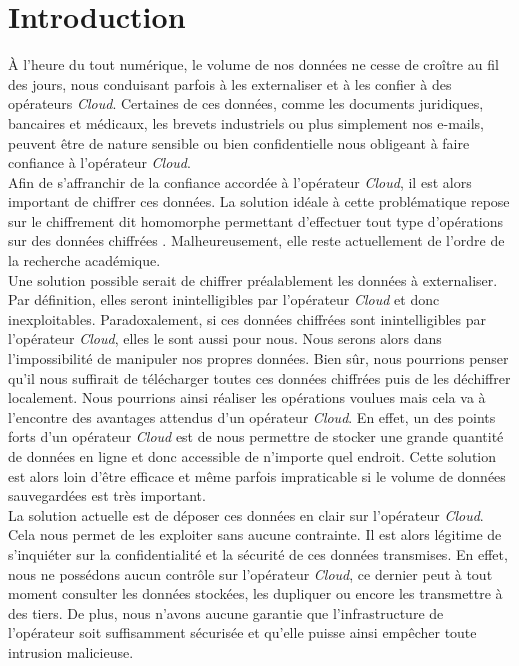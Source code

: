 \chapter*{Introduction}

À l'heure du tout numérique, le volume de nos données ne cesse de croître au fil
des jours, nous conduisant parfois à les externaliser et à les confier à des
opérateurs \textit{Cloud}. Certaines de ces données, comme les documents
juridiques, bancaires et médicaux, les brevets industriels ou plus simplement
nos e-mails, peuvent être de nature sensible ou bien confidentielle nous
obligeant à faire confiance à l'opérateur \textit{Cloud}.\\

Afin de s'affranchir de la confiance accordée à l'opérateur \textit{Cloud}, il
est alors important de chiffrer ces données. La solution idéale à cette
problématique repose sur le chiffrement dit homomorphe permettant d'effectuer
tout type d'opérations sur des données chiffrées \cite{ref7}. Malheureusement,
elle reste actuellement de l'ordre de la recherche académique.\\

Une solution possible serait de chiffrer préalablement les données à
externaliser. Par définition, elles seront inintelligibles par l'opérateur
\textit{Cloud} et donc inexploitables. Paradoxalement, si ces données chiffrées
sont inintelligibles par l'opérateur \textit{Cloud}, elles le sont aussi pour
nous. Nous serons alors dans l'impossibilité de manipuler nos propres données.
Bien sûr, nous pourrions penser qu'il nous suffirait de télécharger toutes ces
données chiffrées puis de les déchiffrer localement. Nous pourrions ainsi
réaliser les opérations voulues mais cela va à l'encontre des avantages attendus
d'un opérateur \textit{Cloud}. En effet, un des points forts d'un opérateur
\textit{Cloud} est de nous permettre de stocker une grande quantité de données
en ligne et donc accessible de n'importe quel endroit. Cette solution est alors
loin d'être efficace et même parfois impraticable si le volume de données
sauvegardées est très important.\\

La solution actuelle est de déposer ces données en clair sur l'opérateur
\textit{Cloud}. Cela nous permet de les exploiter sans aucune contrainte. Il
est alors légitime de s'inquiéter sur la confidentialité et la sécurité de ces
données transmises. En effet, nous ne possédons aucun contrôle sur l'opérateur
\textit{Cloud}, ce dernier peut à tout moment consulter les données stockées,
les dupliquer ou encore les transmettre à des tiers. De plus, nous n'avons
aucune garantie que l'infrastructure de l'opérateur soit suffisamment sécurisée
et qu'elle puisse ainsi empêcher toute intrusion malicieuse.\\

